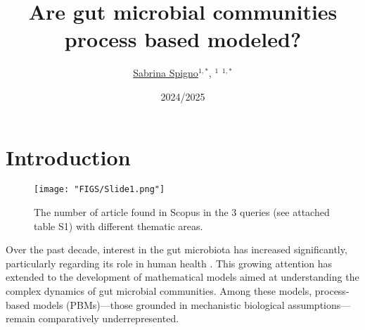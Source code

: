 \documentclass[11pt,a4paper,fleqn]{article}
\begin{document}
\title{Are gut microbial communities process based modeled?}

\author{
	\small{%
		\href{https://orcid.org/}{Sabrina Spigno}\(^{1, *}\),
		\href{https://orcid.org/}{}\(^1\)
		\href{}{}\(^{1, *}\)
	}
}
\date{2024/2025}

\maketitle  

\section{Introduction}
\begin{figure}[ht]
	    \centering
    \texttt{[image: "FIGS/Slide1.png"]} %
    \caption{\label{fig:sample} The number of article found in Scopus in the 3 queries (see attached table S1) with different thematic areas.}
    
\end{figure}


Over the past decade, interest in the gut microbiota has increased significantly, 
particularly regarding its role in human health \cite{adler_life-cycle_2007}.
This growing attention has extended to the development of mathematical models 
aimed at understanding the complex dynamics of gut microbial communities. 
Among these models, process-based models (PBMs)—those grounded in mechanistic biological 
assumptions—remain comparatively underrepresented.
\end{document}
